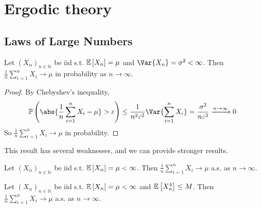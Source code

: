 \section{Ergodic theory}

\subsection{Laws of Large Numbers}

\begin{proposition}
	Let $(X_n)_{n \in \mathbb N}$ be iid s.t. $\mathbb{E}\left[{X_n}\right] = \mu$ and $\Var{X_n} = \sigma^2 < \infty$.
	Then $\frac{1}{n} \sum_{i=1}^n X_i \to \mu$ in probability as $n \to \infty$.
\end{proposition}

\begin{proof}
	By Chebyshev's inequality,
	\begin{align*}
        \prob{\abs{\frac{1}{n}\sum_{i=1}^n X_i - \mu} > \varepsilon} \leq \frac{1}{n^2 \varepsilon^2} \Var{\sum_{i=1}^n X_i} = \frac{\sigma^2}{n\varepsilon^2} \xrightarrow{n \to \infty} 0
    \end{align*}
	So $\frac{1}{n} \sum_{i=1}^n X_i \to \mu$ in probability.
\end{proof}

This result has several weaknesses, and we can provide stronger results.

\begin{proposition}
	Let $(X_n)_{n \in \mathbb N}$ be iid s.t. $\mathbb{E}\left[{X_n}\right] = \mu < \infty$.
	Then $\frac{1}{n} \sum_{i=1}^n X_i \to \mu$ a.s. as $n \to \infty$.
\end{proposition}

\begin{proposition}
	Let $(X_n)_{n \in \mathbb N}$ be iid s.t. $\mathbb{E}\left[{X_n}\right] = \mu < \infty$ and $\mathbb{E}\left[{X_n^4}\right] \leq M$.
	Then $\frac{1}{n} \sum_{i=1}^n X_i \to \mu$ a.s. as $n \to \infty$.
\end{proposition}

